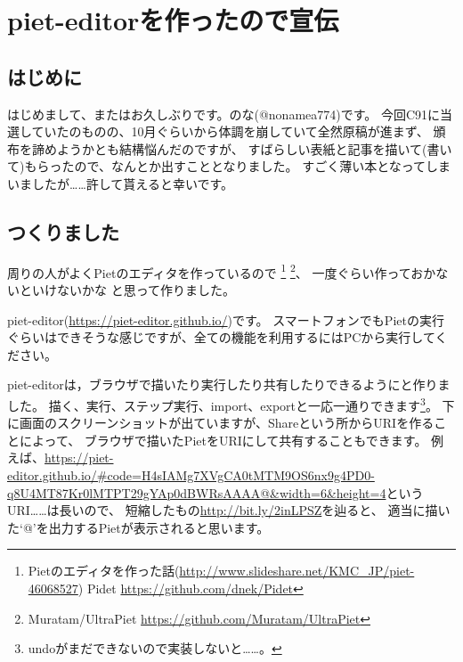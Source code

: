 \chapter[piet-editorを作ったので宣伝]{piet-editorを作ったので宣伝}

\section{はじめに}

はじめまして、またはお久しぶりです。のな(@nonamea774)です。
今回C91に当選していたのものの、10月ぐらいから体調を崩していて全然原稿が進まず、
頒布を諦めようかとも結構悩んだのですが、
すばらしい表紙と記事を描いて(書いて)もらったので、なんとか出すこととなりました。
すごく薄い本となってしまいましたが……許して貰えると幸いです。

\section{つくりました}

周りの人がよくPietのエディタを作っているので
\footnote{Pietのエディタを作った話(\url{http://www.slideshare.net/KMC_JP/piet-46068527}) Pidet \url{https://github.com/dnek/Pidet}}
\footnote{Muratam/UltraPiet \url{https://github.com/Muratam/UltraPiet}}、
一度ぐらい作っておかないといけないかな と思って作りました。

piet-editor(\url{https://piet-editor.github.io/})です。
スマートフォンでもPietの実行ぐらいはできそうな感じですが、全ての機能を利用するにはPCから実行してください。

piet-editorは，ブラウザで描いたり実行したり共有したりできるようにと作りました。
描く、実行、ステップ実行、import、exportと一応一通りできます\footnote{undoがまだできないので実装しないと……。}。
下に画面のスクリーンショットが出ていますが、Shareという所からURIを作ることによって、
ブラウザで描いたPietをURIにして共有することもできます。
例えば、\href{https://piet-editor.github.io/#code=H4sIAMg7XVgCA0tMTM9OS6nx9g4PD0-q8U4MT87Kr0lMTPT29gYAp0dBWRsAAAA@&width=6&height=4}{https://piet-editor.github.io/\#code=H4sIAMg7XVgCA0tMTM9OS6nx9g4PD0-q8U4MT87Kr0lMTPT29gYAp0dBWRsAAAA@\&width=6\&height=4}というURI……は長いので、
短縮したもの\url{http://bit.ly/2inLPSZ}を辿ると、
適当に描いた`@'を出力するPietが表示されると思います。

